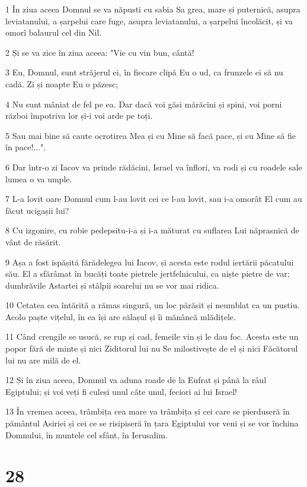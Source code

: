 \par 1 În ziua aceea Domnul se va năpusti cu sabia Sa grea, mare și puternică, asupra leviatanului, a șarpelui care fuge, asupra leviatanului, a șarpelui încolăcit, și va omorî balaurul cel din Nil.
\par 2 Și se va zice în ziua aceea: "Vie cu vin bun, cântă!
\par 3 Eu, Domnul, sunt străjerul ei, în fiecare clipă Eu o ud, ca frunzele ei să nu cadă. Zi și noapte Eu o păzesc;
\par 4 Nu sunt mâniat de fel pe ea. Dar dacă voi găsi mărăcini și spini, voi porni război împotriva lor și-i voi arde pe toți.
\par 5 Sau mai bine să caute ocrotirea Mea și cu Mine să facă pace, și cu Mine să fie în pace!...".
\par 6 Dar într-o zi Iacov va prinde rădăcini, Israel va înflori, va rodi și cu roadele sale lumea o va umple.
\par 7 L-a lovit oare Domnul cum l-au lovit cei ce l-au lovit, sau i-a omorât El cum au făcut ucigașii lui?
\par 8 Cu izgonire, cu robie pedepsitu-i-a și i-a măturat cu suflarea Lui năprasnică de vânt de răsărit.
\par 9 Așa a fost ispășită fărădelegea lui Iacov, și acesta este rodul iertării păcatului său. El a sfărâmat în bucăți toate pietrele jertfelnicului, ca niște pietre de var; dumbrăvile Astartei și stâlpii soarelui nu se vor mai ridica.
\par 10 Cetatea cea întărită a rămas singură, un loc părăsit și neumblat ca un pustiu. Acolo paște vițelul, în ea își are sălașul și îi mănâncă mlădițele.
\par 11 Când crengile se usucă, se rup și cad, femeile vin și le dau foc. Acesta este un popor fără de minte și nici Ziditorul lui nu Se milostivește de el și nici Făcătorul lui nu are milă de el.
\par 12 Și în ziua aceea, Domnul va aduna roade de la Eufrat și până la râul Egiptului; și voi veți fi culeși unul câte unul, feciori ai lui Israel!
\par 13 În vremea aceea, trâmbița cea mare va trâmbița și cei care se pierduseră în pământul Asiriei și cei ce se risipiseră în țara Egiptului vor veni și se vor închina Domnului, în muntele cel sfânt, în Ierusalim.

\chapter{28}

